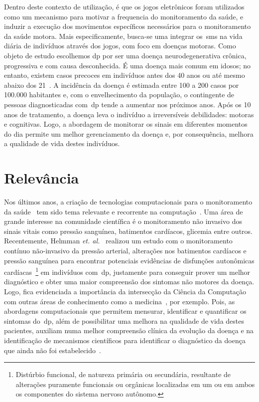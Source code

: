 Dentro deste contexto de utilização, é que os jogos eletrônicos foram utilizados como um mecanismo para motivar a frequencia do monitoramento da saúde, e induzir a execução dos movimentos específicos necessários para o monitoramento da saúde motora. Mais especificamente, busca-se uma integrar os~\ac{sms} na vida diária de indivíduos através dos jogos, com foco em doenças motoras. Como objeto de estudo escolhemos \ac{dp} por ser uma doença neurodegenerativa crônica, progressiva e com causa desconhecida. É uma doença mais comum em idosos; no entanto, existem casos precoces em indivíduos antes dos 40 anos ou até mesmo abaixo dos 21~\cite{menezes2003}. A incidência da doença é estimada entre 100 a 200 casos por 100.000 habitantes e, com o envelhecimento da população, o contingente de pessoas diagnosticadas com~\ac{dp} tende a aumentar nos próximos anos. Após os 10 anos de tratamento, a doença leva o indivíduo a irreversíveis debilidades: motoras e cognitivas. Logo, a abordagem de monitorar os sinais em diferentes momentos do dia permite um melhor gerenciamento da doença e, por consequência, melhora a qualidade de vida destes indivíduos.


\section{Relevância}\label{section:relevancia}
Nos últimos anos, a criação de tecnologias computacionais para o monitoramento da saúde~\cite{bardram2008} tem sido tema relevante e recorrente na computação~\cite{bradmonitor2015,compapproachparkinson2015,mazilu2015}. Uma área de grande interesse na comunidade científica é o monitoramento não invasivo dos sinais vitais como pressão sanguínea, batimentos cardíacos, glicemia entre outros. Recentemente, Helmman \textit{et. al.}~\cite{autonomparkin2015} realizou um estudo com o monitoramento contínuo não-invasivo da pressão arterial, alterações nos batimentos cardíacos e pressão sanguínea para encontrar potenciais evidências de disfunções autonômicas cardíacas~\footnote{Distúrbio funcional, de natureza primária ou secundária, resultante de alterações  puramente funcionais ou orgânicas localizadas em um  ou em ambos os componentes do sistema nervoso autônomo.} em indivíduos com~\ac{dp}, justamente para conseguir prover um melhor diagnóstico e obter uma maior compreensão dos sintomas não motores da doença. Logo, fica evidenciada a importância da intersecção da Ciência da Computação com outras áreas de conhecimento como a medicina~\cite{bardram2008}, por exemplo. Pois, as abordagens computacionais que permitem mensurar, identificar e quantificar os sintomas do~\ac{dp}, além de possibilitar uma melhora na qualidade de vida destes pacientes, auxiliam numa melhor compreensão clínica da evolução da doença e na identificação de mecanismos científicos para identificar o diagnóstico da doença que ainda não foi estabelecido~\cite{compapproachparkinson2015}.

